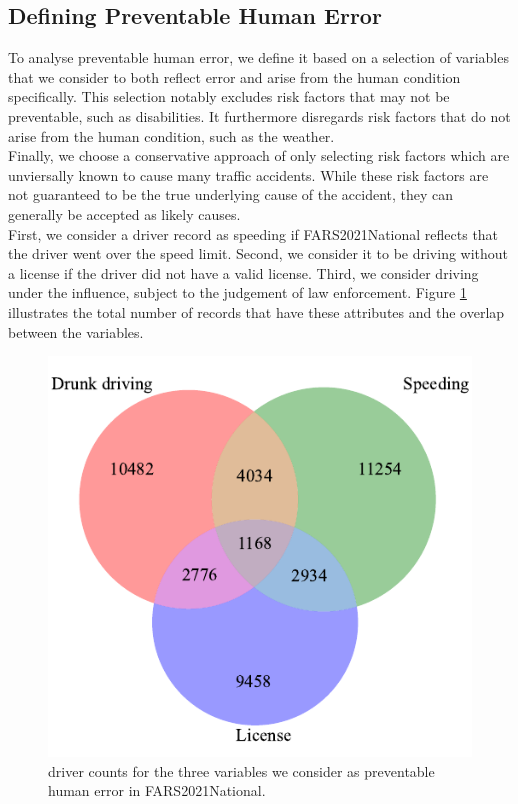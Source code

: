 \documentclass{article}
\theoremstyle{plain}
\theoremstyle{definition}
\theoremstyle{remark}
\begin{document}
\subsection{Defining Preventable Human Error}
To analyse preventable human error, we define it based on a selection of variables that we consider to both reflect error and arise from the human condition specifically. This selection notably excludes risk factors that may not be preventable, such as disabilities. It furthermore disregards risk factors that do not arise from the human condition, such as the weather.\\
Finally, we choose a conservative approach of only selecting risk factors which are unviersally known to cause many traffic accidents. While these risk factors are not guaranteed to be the true underlying cause of the accident, they can generally be accepted as likely causes.
\\
First, we consider a driver record as speeding if FARS2021National reflects that the driver went over the speed limit. Second, we consider it to be driving without a license if the driver did not have a valid license. Third, we consider driving under the influence, subject to the judgement of law enforcement. Figure \ref{fig:drivers-err-overlap} illustrates the total number of records that have these attributes and the overlap between the variables.\\

\begin{figure}[ht]
	\vskip 0.2in
	\begin{center}
		\centerline{\includegraphics[width=0.49\columnwidth]{plots/drivers-err-overlap}}
		\caption{driver counts for the three variables we consider as preventable human error in FARS2021National.}
		\label{fig:drivers-err-overlap}
	\end{center}
	\vskip -0.2in
\end{figure}
\end{document}
